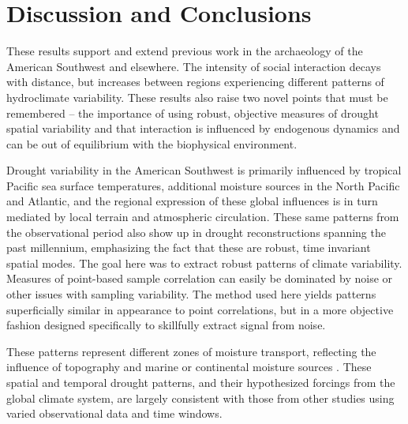 \documentclass[10pt]{iopart}
\begin{document}




\section*{Discussion and Conclusions}
These results support and extend previous work in the archaeology of the American Southwest and elsewhere. The intensity of social interaction decays with distance, but increases between regions experiencing different patterns of hydroclimate variability. These results also raise two novel points that must be remembered -- the importance of using robust, objective measures of drought spatial variability and that interaction is influenced by endogenous dynamics and can be out of equilibrium with the biophysical environment.

Drought variability in the American Southwest is primarily influenced by tropical Pacific sea surface temperatures, additional moisture sources in the North Pacific and Atlantic, and the regional expression of these global influences is in turn mediated by local terrain and atmospheric circulation. These same patterns from the observational period also show up in drought reconstructions spanning the past millennium, emphasizing the fact that these are robust, time invariant spatial modes.
The goal here was to extract robust patterns of climate variability. Measures of point-based sample correlation can easily be dominated by noise or other issues with sampling variability. The method used here yields patterns superficially similar in appearance to point correlations, but in a more objective fashion designed specifically to skillfully extract signal from noise. 

These patterns represent different zones of moisture transport, reflecting the influence of topography and marine or continental moisture sources \parencite{Liu2010, Hu2011}. These spatial and temporal drought patterns, and their hypothesized forcings from the global climate system, are largely consistent with those from other studies using varied observational data and time windows\parencite{Comrie1999,Cook1999,McCabe1999,McCabe2004,Herrmann2016DivergentElevations,Ryu2010,Seager2014}. 
\end{document}
